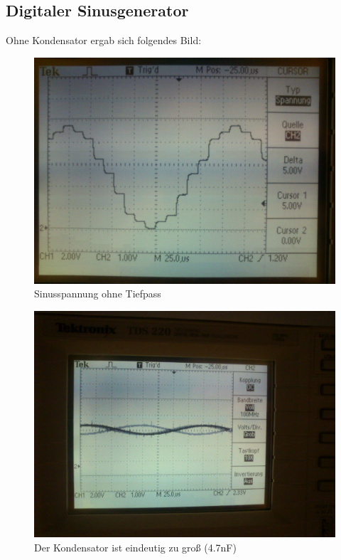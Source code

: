 \subsection{Digitaler Sinusgenerator}
Ohne Kondensator ergab sich folgendes Bild:
\begin{figure}[H]
	\centering
	\includegraphics[width=\linewidth]{versuch9/oszi/DSC_0625.JPG}
	\caption{Sinusspannung ohne Tiefpass}
\end{figure}
\begin{figure}[H]
	\centering
	\includegraphics[width=\linewidth]{versuch9/oszi/DSC_0628.JPG}
	\caption{Der Kondensator ist eindeutig zu groß (4.7nF)}
\end{figure}
